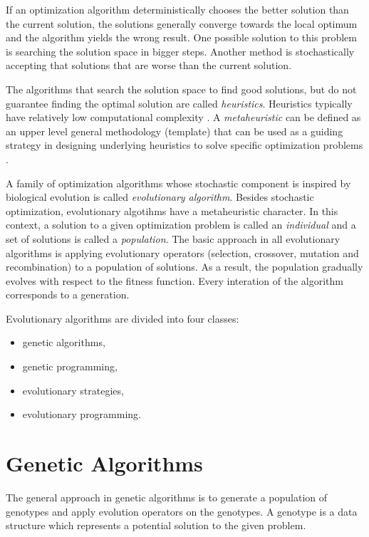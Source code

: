 If an optimization algorithm deterministically chooses the better solution than the current solution, the solutions generally converge towards the local optimum and the algorithm yields the wrong result.
One possible solution to this problem is searching the solution space in bigger steps.
Another method is stochastically accepting that solutions that are worse than the current solution.

The algorithms that search the solution space to find good solutions, but do not guarantee finding the optimal solution are called \textit{heuristics}. 
Heuristics typically have relatively low computational complexity \cite{cupic2013prirodom}.
A \textit{metaheuristic} can be defined as an upper level general methodology (template) that can be used as a guiding strategy in designing underlying heuristics to solve specific optimization problems \cite{talbi2009metaheuristics}.

A family of optimization algorithms whose stochastic component is inspired by biological evolution is called \textit{evolutionary algorithm}.
Besides stochastic optimization, evolutionary algotihms have a metaheuristic character.
In this context, a solution to a given optimization problem is called an \textit{individual} and a set of solutions is called a \textit{population}.
The basic approach in all evolutionary algorithms is applying evolutionary operators (selection, crossover, mutation and recombination) to a population of solutions.
As a result, the population gradually evolves with respect to the fitness function.
Every interation of the algorithm corresponds to a generation.

Evolutionary algorithms are divided into four classes: 
\begin{itemize}
	\item genetic algorithms,
	\item genetic programming,
	\item evolutionary strategies,
	\item evolutionary programming.
\end{itemize}

\section{Genetic Algorithms}
The general approach in genetic algorithms is to generate a population of genotypes and apply evolution operators on the genotypes.
A genotype is a data structure which represents a potential solution to the given problem.

